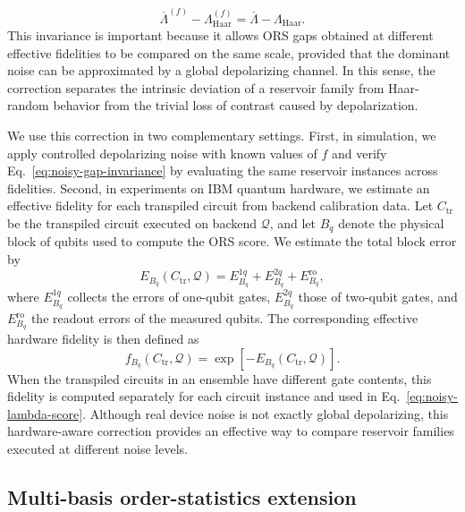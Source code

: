\documentclass[
    aps,
    pre,
    amsmath,
    amssymb,
    reprint,
    superscriptaddress,
    preprintnumbers,
]{revtex4-2}
\begin{document}
\begin{equation}
\overline{\Lambda}^{(f)}
-
\Lambda_{\mathrm{Haar}}^{(f)}
=
\overline{\Lambda}
-
\Lambda_{\mathrm{Haar}}.
\label{eq:noisy-gap-invariance}
\end{equation}
This invariance is important because it allows ORS gaps obtained at different effective fidelities to be compared on the same scale, provided that the dominant noise can be approximated by a global depolarizing channel. In this sense, the correction separates the intrinsic deviation of a reservoir family from Haar-random behavior from the trivial loss of contrast caused by depolarization.

We use this correction in two complementary settings. First, in simulation, we apply controlled depolarizing noise with known values of $f$ and verify Eq.~\eqref{eq:noisy-gap-invariance} by evaluating the same reservoir instances across fidelities. Second, in experiments on IBM quantum hardware, we estimate an effective fidelity for each transpiled circuit from backend calibration data. Let $C_{\mathrm{tr}}$ be the transpiled circuit executed on backend $\mathcal{Q}$, and let $B_q$ denote the physical block of qubits used to compute the ORS score. We estimate the total block error by 
\begin{equation}
E_{B_q}(C_{\mathrm{tr}},\mathcal{Q})
=
E_{B_q}^{1q}
+
E_{B_q}^{2q}
+
E_{B_q}^{\mathrm{ro}},
\label{eq:block-error-decomposition}
\end{equation}
where $E_{B_q}^{1q}$ collects the errors of one-qubit gates, $E_{B_q}^{2q}$ those of two-qubit gates, and $E_{B_q}^{\mathrm{ro}}$ the readout errors of the measured qubits. The corresponding effective hardware fidelity is then defined as
\begin{equation}
f_{B_q}(C_{\mathrm{tr}},\mathcal{Q})
=
\exp\left[
-
E_{B_q}(C_{\mathrm{tr}},\mathcal{Q})
\right].
\label{eq:block-fidelity}
\end{equation}
When the transpiled circuits in an ensemble have different gate contents, this fidelity is computed separately for each circuit instance and used in Eq.~\eqref{eq:noisy-lambda-score}. Although real device noise is not exactly global depolarizing, this hardware-aware correction provides an effective way to compare reservoir families executed at different noise levels.
\subsection{Multi-basis order-statistics extension}
\label{sec:methods-multi-basis}
\end{document}
